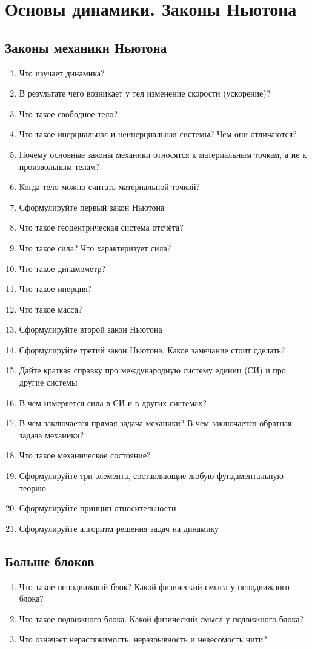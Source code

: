 \documentclass[12pt,a4paper]{report}
\begin{document}
\chapter{Основы динамики. Законы Ньютона}
\section{Законы механики Ньютона}
\begin{enumerate}
\item Что изучает динамика?
\item В результате чего возникает у тел изменение скорости (ускорение)?
\item Что такое свободное тело?
\item Что такое инерциальная и неинерциальная системы? Чем они отличаются?
\item Почему основные законы механики относятся к материальным точкам, а не к произвольным телам?
\item Когда тело можно считать материальной точкой?
\item Сформулируйте первый закон Ньютона
\item Что такое геоцентрическая система отсчёта?
\item Что такое сила? Что характеризует сила?
\item Что такое динамометр?
\item Что такое инерция?
\item Что такое масса?
\item Сформулируйте второй закон Ньютона
\item Сформулируйте третий закон Ньютона. Какое замечание стоит сделать?
\item Дайте краткая справку про международную систему единиц (СИ) и про другие системы
\item В чем измеряется сила в СИ и в других системах?
\item В чем заключается прямая задача механики? В чем заключается обратная задача механики?
\item Что такое механическое состояние?
\item Сформулируйте три элемента, составляющие любую фундаментальную теорию
\item Сформулируйте принцип относительности
\item Сформулируйте алгоритм решения задач на динамику
\end{enumerate}

\section{Больше блоков}
\begin{enumerate} 
\item Что такое неподвижный блок? Какой физический смысл у неподвижного блока?
\item Что такое подвижного блока. Какой физический смысл у подвижного блока?
\item Что означает нерастяжимость, неразрывность и невесомость нити?
\end{enumerate}
\end{document}
